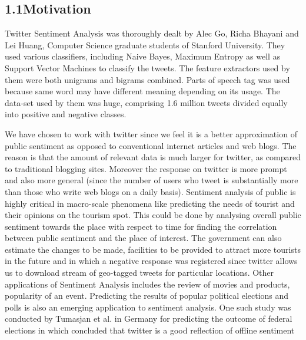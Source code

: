 \documentclass[12pt]{article}
\begin{document}
\vspace{\baselineskip}

\vspace{\baselineskip}
\subsection*{1.1\hspace*{10pt}Motivation}
\begin{adjustwidth}{0.32in}{0.0in}
\begin{justify}
Twitter Sentiment Analysis was thoroughly dealt by Alec Go, Richa Bhayani and Lei Huang, Computer Science graduate students of Stanford University. They used various classifiers, including Naive Bayes, Maximum Entropy as well as Support Vector Machines to classify the tweets. The feature extractors used by them were both unigrams and bigrams combined. Parts of speech tag was used because same word may have different meaning depending on its usage. The data-set used by them was huge, comprising 1.6 million tweets divided equally into positive and negative classes.
\end{justify}\par

\end{adjustwidth}

\begin{adjustwidth}{0.32in}{0.0in}
\begin{justify}
\tab We have chosen to work with twitter since we feel it is a better approximation of public sentiment as opposed to conventional internet articles and web blogs. The reason is that the amount of relevant data is much larger for twitter, as compared to traditional blogging sites. Moreover the response on twitter is more prompt and also more general (since the number of users who tweet is substantially more than those who write web blogs on a daily basis). Sentiment analysis of public is highly critical in macro-scale phenomena like predicting the needs of tourist and their opinions on the tourism spot. This could be done by analysing overall public sentiment towards the place with respect to time for finding the correlation between public sentiment and the place of interest. The government can also estimate the changes to be made, facilities to be provided to attract more tourists in the future and in which a negative response was registered since twitter allows us to download stream of geo-tagged tweets for particular locations. Other applications of Sentiment Analysis includes the review of movies and products, popularity of an event. Predicting the results of popular political elections and polls is also an emerging application to sentiment analysis. One such study was conducted by Tumasjan et al. in Germany for predicting the outcome of federal elections in which concluded that twitter is a good reflection of offline sentiment 
\end{justify}\par

\end{adjustwidth}
\end{document}

